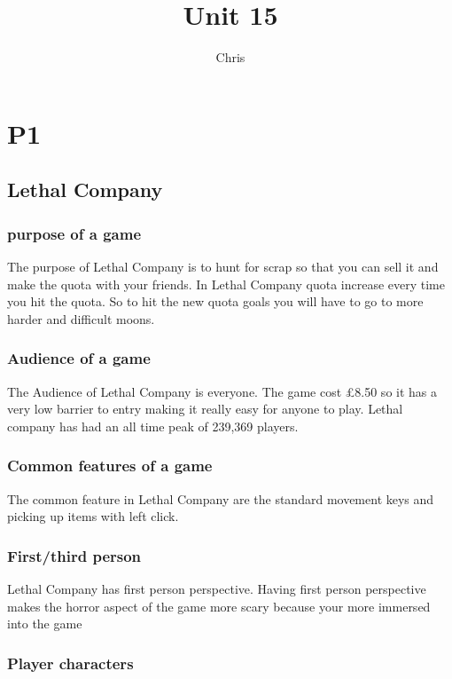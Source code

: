 \documentclass{article}
\title{Unit 15}
\author{Chris}
\date{}
\begin{document}
\maketitle
\tableofcontents
\break


\section{P1}


\subsection{Lethal Company}
\subsubsection{purpose of a game}

The purpose of Lethal Company is to hunt for scrap so that you can sell it and make the quota with your friends. In Lethal Company quota increase every time you hit the quota. So to hit the new quota goals you will have to go to more harder and difficult moons.

\subsubsection{Audience of a game}

The Audience of Lethal Company is everyone. The game cost £8.50 so it has a very low barrier to entry making it really easy for anyone to play. Lethal company has had an all time peak of 239,369 players.

\subsubsection{Common features of a game}

The common feature in Lethal Company are the standard movement keys and picking up items with left click.

\subsubsection{First/third person}

Lethal Company has first person perspective. Having first person perspective makes the horror aspect of the game more scary because your more immersed into the game

\subsubsection{Player characters}
\end{document}
